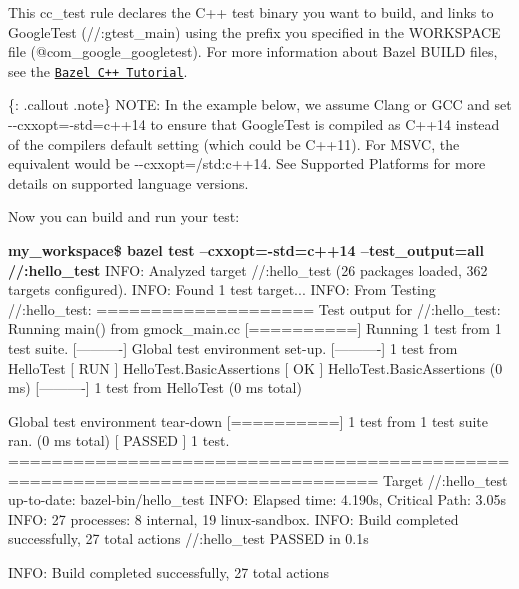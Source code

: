 This {\ttfamily cc\+\_\+test} rule declares the C++ test binary you want to build, and links to Google\+Test ({\ttfamily //\+:gtest\+\_\+main}) using the prefix you specified in the {\ttfamily W\+O\+R\+K\+S\+P\+A\+CE} file ({\ttfamily @com\+\_\+google\+\_\+googletest}). For more information about Bazel {\ttfamily B\+U\+I\+LD} files, see the \href{https://docs.bazel.build/versions/main/tutorial/cpp.html}{\tt Bazel C++ Tutorial}.

\{\+: .callout .note\} N\+O\+TE\+: In the example below, we assume Clang or G\+CC and set {\ttfamily -\/-\/cxxopt=-\/std=c++14} to ensure that Google\+Test is compiled as C++14 instead of the compiler\textquotesingle{}s default setting (which could be C++11). For M\+S\+VC, the equivalent would be {\ttfamily -\/-\/cxxopt=/std\+:c++14}. See Supported Platforms for more details on supported language versions.

Now you can build and run your test\+:


\begin{DoxyPre}
{\bfseries my\_workspace\$ bazel test --cxxopt=-std=c++14 --test\_output=all //:hello\_test}
INFO: Analyzed target //:hello\_test (26 packages loaded, 362 targets configured).
INFO: Found 1 test target...
INFO: From Testing //:hello\_test:
==================== Test output for //:hello\_test:
Running main() from gmock\_main.cc
[==========] Running 1 test from 1 test suite.
[----------] Global test environment set-up.
[----------] 1 test from HelloTest
[ RUN      ] HelloTest.BasicAssertions
[       OK ] HelloTest.BasicAssertions (0 ms)
[----------] 1 test from HelloTest (0 ms total)\end{DoxyPre}



\begin{DoxyPre}[----------] Global test environment tear-down
[==========] 1 test from 1 test suite ran. (0 ms total)
[  PASSED  ] 1 test.
================================================================================
Target //:hello\_test up-to-date:
  bazel-bin/hello\_test
INFO: Elapsed time: 4.190s, Critical Path: 3.05s
INFO: 27 processes: 8 internal, 19 linux-sandbox.
INFO: Build completed successfully, 27 total actions
//:hello\_test                                                     PASSED in 0.1s\end{DoxyPre}



\begin{DoxyPre}INFO: Build completed successfully, 27 total actions
\end{DoxyPre}



